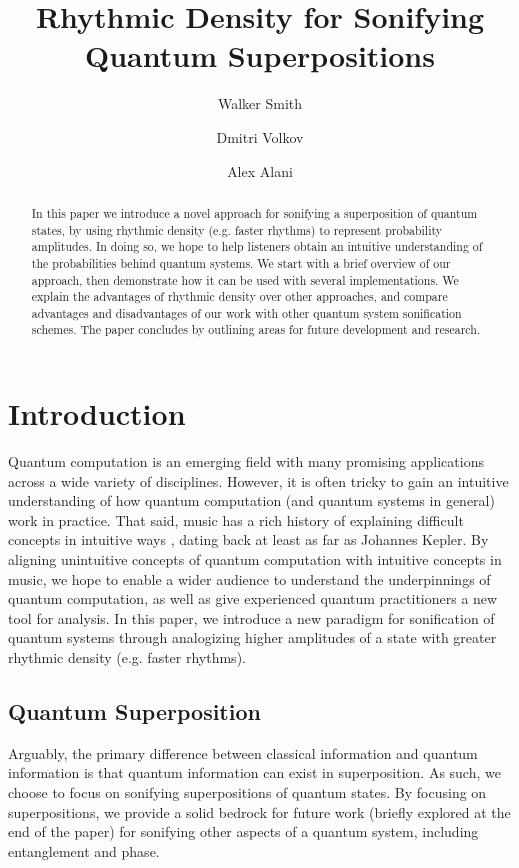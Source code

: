 \documentclass[10pt,twocolumn]{article}
\title{Rhythmic Density for Sonifying Quantum Superpositions}
\author{Walker Smith\inst{1} \and
        Dmitri Volkov\inst{1} \and
        Alex Alani\inst{1}}
\begin{document}
\maketitle

\begin{abstract}
In this paper we introduce a novel approach for sonifying a superposition of quantum states, by using rhythmic density (e.g. faster rhythms) to represent probability amplitudes. In doing so, we hope to help listeners obtain an intuitive understanding of the probabilities behind quantum systems. We start with a brief overview of our approach, then demonstrate how it can be used with several implementations. We explain the advantages of rhythmic density over other approaches, and compare advantages and disadvantages of our work with other quantum system sonification schemes. The paper concludes by outlining areas for future development and research.
\end{abstract}

\section{Introduction}

Quantum computation is an emerging field with many promising applications across a wide variety of disciplines\cite{ukpabi2023framework}. However, it is often tricky to gain an intuitive understanding of how quantum computation (and quantum systems in general) work in practice\cite{qcvc}. That said, music has a rich history of explaining difficult concepts in intuitive ways \cite{watzke2022}\cite{smith2022}, dating back at least as far as Johannes Kepler\cite{rodgers1979}. By aligning unintuitive concepts of quantum computation with intuitive concepts in music, we hope to enable a wider audience to understand the underpinnings of quantum computation, as well as give experienced quantum practitioners a new tool for analysis. In this paper, we introduce a new paradigm for sonification of quantum systems through analogizing higher amplitudes of a state with greater rhythmic density (e.g. faster rhythms).

\subsection{Quantum Superposition}

Arguably, the primary difference between classical information and quantum information is that quantum information can exist in superposition. As such, we choose to focus on sonifying superpositions of quantum states. By focusing on superpositions, we provide a solid bedrock for future work (briefly explored at the end of the paper) for sonifying other aspects of a quantum system, including entanglement and phase.
\end{document}
